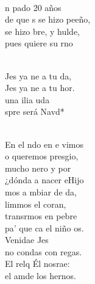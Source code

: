 \begin{cancion}%
	  \\
	n pado 20 años\\
	de que s se hizo peeño,\\
	se hizo bre, y hulde,\\
	pues  quiere su rno\\\jump\\
	\begin{chorus}%
	Jes ya ne a tu da,\\
	Jes ya ne a tu hor.\\
	una ilia uda \\
	spre será Navd*  \\
	\end{chorus}%
	\jump\\
	En el ndo en e vimos\\
	o queremos presgio,\\
	mucho nero y por\\
	¿dónda a nacer eHijo\\
\jump
	mos a mbiar de da,\\
	limmos el coran, \\
	transrmos en pebre \\
	pa' que ca el niño os.\\
\jump
	 Venidae Jes \\
	no condas con regas.\\
	El relq Él nosrae:\\
	el amde los hernos. \\
\end{cancion}%
